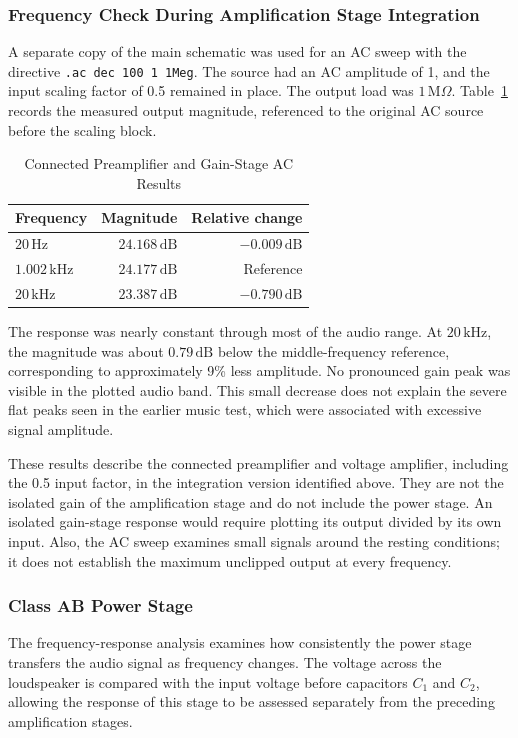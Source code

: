 \documentclass[conference]{IEEEtran}
\begin{document}
\subsubsection{Frequency Check During Amplification Stage Integration}
A separate copy of the main schematic was used for an AC sweep with the directive \texttt{.ac dec 100 1 1Meg}. The source had an AC amplitude of 1, and the input scaling factor of 0.5 remained in place. The output load was $1\,\mathrm{M}\Omega$. Table~\ref{tab:amplification_ac} records the measured output magnitude, referenced to the original AC source before the scaling block.

\begin{table}[H]
\caption{Connected Preamplifier and Gain-Stage AC Results}
\label{tab:amplification_ac}
\centering
\begin{tabular}{lrr}
\toprule
Frequency & Magnitude & Relative change \\
\midrule
$20\,\mathrm{Hz}$ & $24.168\,\mathrm{dB}$ & $-0.009\,\mathrm{dB}$ \\
$1.002\,\mathrm{kHz}$ & $24.177\,\mathrm{dB}$ & Reference \\
$20\,\mathrm{kHz}$ & $23.387\,\mathrm{dB}$ & $-0.790\,\mathrm{dB}$ \\
\bottomrule
\end{tabular}
\end{table}

The response was nearly constant through most of the audio range. At $20\,\mathrm{kHz}$, the magnitude was about $0.79\,\mathrm{dB}$ below the middle-frequency reference, corresponding to approximately 9\% less amplitude. No pronounced gain peak was visible in the plotted audio band. This small decrease does not explain the severe flat peaks seen in the earlier music test, which were associated with excessive signal amplitude.

These results describe the connected preamplifier and voltage amplifier, including the 0.5 input factor, in the integration version identified above. They are not the isolated gain of the amplification stage and do not include the power stage. An isolated gain-stage response would require plotting its output divided by its own input. Also, the AC sweep examines small signals around the resting conditions; it does not establish the maximum unclipped output at every frequency.

\subsubsection{Class AB Power Stage}
The frequency-response analysis examines how consistently the power stage transfers the audio signal as frequency changes. The voltage across the loudspeaker is compared with the input voltage before capacitors $C_1$ and $C_2$, allowing the response of this stage to be assessed separately from the preceding amplification stages.
\end{document}
